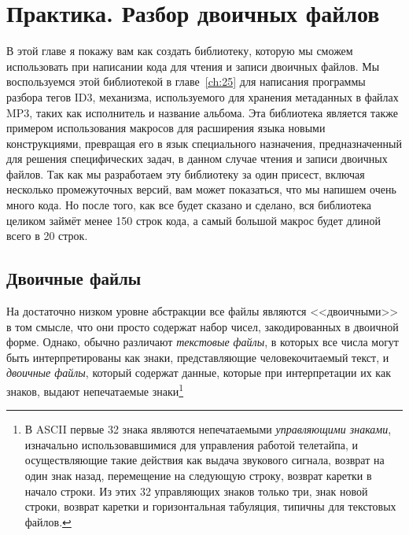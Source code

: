 
\chapter{Практика. Разбор двоичных файлов}
\label{ch:24}

В этой главе я покажу вам как создать библиотеку, которую мы сможем использовать при
написании кода для чтения и записи двоичных файлов. Мы воспользуемся этой библиотекой в
главе~\ref{ch:25} для написания программы разбора тегов ID3, механизма, используемого для
хранения метаданных в файлах MP3, таких как исполнитель и название альбома. Эта библиотека
является также примером использования макросов для расширения языка новыми конструкциями,
превращая его в язык специального назначения, предназначенный для решения специфических
задач, в данном случае чтения и записи двоичных файлов. Так как мы разработаем эту
библиотеку за один присест, включая несколько промежуточных версий, вам может показаться,
что мы напишем очень много кода. Но после того, как все будет сказано и сделано, вся
библиотека целиком займёт менее 150 строк кода, а самый большой макрос будет длиной всего
в 20 строк.

\section{Двоичные файлы}

На достаточно низком уровне абстракции все файлы являются <<двоичными>> в том смысле, что
они просто содержат набор чисел, закодированных в двоичной форме.  Однако, обычно
различают \textit{текстовые файлы}, в которых все числа могут быть интерпретированы как
знаки, представляющие человекочитаемый текст, и \textit{двоичные файлы}, который содержат
данные, которые при интерпретации их как знаков, выдают непечатаемые знаки\footnote{В
  ASCII первые 32 знака являются непечатаемыми \textit{управляющими знаками}, изначально
  использовавшимися для управления работой телетайпа, и осуществляющие такие действия как
  выдача звукового сигнала, возврат на один знак назад, перемещение на следующую строку,
  возврат каретки в начало строки. Из этих 32 управляющих знаков только три, знак новой
  строки, возврат каретки и горизонтальная табуляция, типичны для текстовых файлов.}

